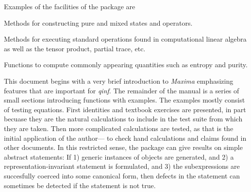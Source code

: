 \documentclass[leqno,10pt]{article}
\newcommand{\pname}[1]{{\it #1}} %
\newcommand{\qinfp}{{\it qinf}} %
\begin{document}
Examples of the facilities of the
package are
\begin{itemize}
  \begin{item}
    Methods for constructing pure and mixed states and operators.
  \end{item}
  \begin{item}
    Methods for executing standard operations found in
    computational linear algebra as well as the tensor
    product, partial trace, etc.
  \end{item}
  \begin{item}
    Functions to compute commonly appearing quantities such as entropy and purity.
  \end{item}
\end{itemize}
This document begins with a very brief introduction to
\pname{Maxima} emphasizing features that are important for
\qinfp. The remainder of the manual is a series of small
sections introducing functions with examples. The examples
mostly consist of testing equations. First identities and
textbook exercises are presented, in part becuase they are
the natural calculations to include in the test suite from
which they are taken. Then more complicated calculations are
tested, as that is the initial application of the author--- to
check hand calculations and claims found in other documents.
In this restricted sense, the package can give results on
simple abstract statements: If 1) generic instances of objects are
generated, and 2) a representation-invariant statement is
formulated, and 3) the subexpressions are succesfully coerced
into some canonical form, then defects in the statement can
sometimes be detected if the statement is not true.
\end{document}
